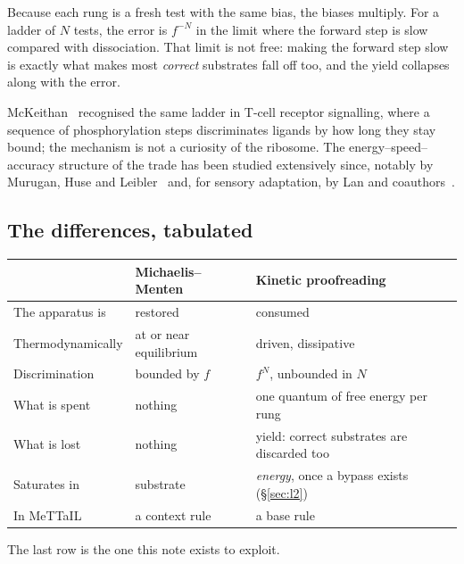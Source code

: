 \documentclass[11pt]{article}
\theoremstyle{plain}
\theoremstyle{definition}
\theoremstyle{remark}
\begin{document}
Because each rung is a fresh test with the same bias, the biases multiply. For
a ladder of $N$ tests, the error is $f^{-N}$ in the limit where the forward
step is slow compared with dissociation. That limit is not free: making the
forward step slow is exactly what makes most \emph{correct} substrates fall
off too, and the yield collapses along with the error.

McKeithan~\cite{McKeithan1995} recognised the same ladder in T-cell receptor
signalling, where a sequence of phosphorylation steps discriminates ligands by
how long they stay bound; the mechanism is not a curiosity of the ribosome.
The energy--speed--accuracy structure of the trade has been studied
extensively since, notably by Murugan, Huse and Leibler~\cite{Murugan2012} and,
for sensory adaptation, by Lan and coauthors~\cite{Lan2012}.

\subsection{The differences, tabulated}

\begin{center}
\begin{tabular}{@{}p{}p{}p{}@{}}
\toprule
 & \textbf{Michaelis--Menten} & \textbf{Kinetic proofreading} \\
\midrule
The apparatus is & restored & consumed \\[3pt]
Thermodynamically & at or near equilibrium & driven, dissipative \\[3pt]
Discrimination & bounded by $f$ & $f^{N}$, unbounded in $N$ \\[3pt]
What is spent & nothing & one quantum of free energy per rung \\[3pt]
What is lost & nothing & yield: correct substrates are discarded too \\[3pt]
Saturates in & substrate & \emph{energy}, once a bypass exists (\S\ref{sec:l2}) \\[3pt]
In MeTTaIL & a context rule & a base rule \\
\bottomrule
\end{tabular}
\end{center}

The last row is the one this note exists to exploit.
\end{document}
